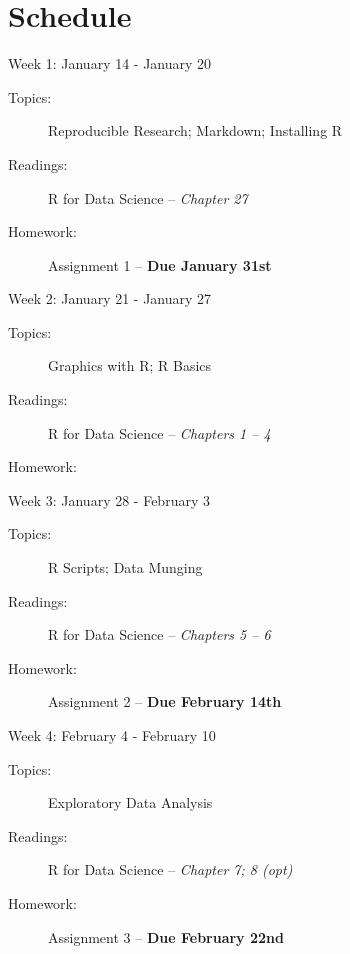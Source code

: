 \documentclass[11pt,article,oneside]{memoir}
\newcounter{schedule}
\begin{document}
\section*{Schedule}
\begin{schedule}{Week 1: January 14 - January 20}
\begin{description}
\item[Topics:] Reproducible Research; Markdown;  Installing R

\item[Readings:] R for Data Science -- \textit{Chapter 27}

\item[Homework:] Assignment 1 -- \textbf{Due January 31st}

\end{description}
\end{schedule}
\begin{schedule}{Week 2: January 21 - January 27}
\begin{description}
\item[Topics:] Graphics with R; R Basics

\item[Readings:] R for Data Science -- \textit{Chapters 1 -- 4}

\item[Homework:] 

\end{description}
\end{schedule}
\begin{schedule}{Week 3: January 28 - February 3}
\begin{description}
\item[Topics:] R Scripts; Data Munging

\item[Readings:] R for Data Science -- \textit{Chapters 5 -- 6}

\item[Homework:] Assignment 2 -- \textbf{Due February 14th}

\end{description}
\end{schedule}
\newpage
\begin{schedule}{Week 4: February 4 - February 10}
\begin{description}
\item[Topics:] Exploratory Data Analysis 

\item[Readings:] R for Data Science -- \textit{Chapter 7; 8 (opt)}

\item[Homework:] Assignment 3 -- \textbf{Due February 22nd}

\end{description}
\end{schedule}
\end{document}

